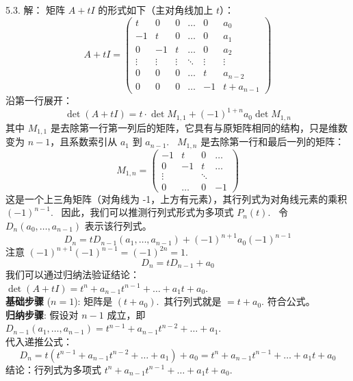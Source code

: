 \begin{exer}
5.3. 解：
矩阵 $A+tI$ 的形式如下（主对角线加上 $t$）：
$$ A+tI = \begin{pmatrix} t & 0 & 0 & \dots & 0 & a_0 \\ -1 & t & 0 & \dots & 0 & a_1 \\ 0 & -1 & t & \dots & 0 & a_2 \\ \vdots & \vdots & \vdots & \ddots & \vdots & \vdots \\ 0 & 0 & 0 & \dots & t & a_{n-2} \\ 0 & 0 & 0 & \dots & -1 & t+a_{n-1} \end{pmatrix} $$
沿第一行展开：
$$ \det(A+tI) = t \cdot \det M_{1,1} + (-1)^{1+n} a_0 \det M_{1,n} $$
其中 $M_{1,1}$ 是去除第一行第一列后的矩阵，它具有与原矩阵相同的结构，只是维数变为 $n-1$，且系数索引从 $a_1$ 到 $a_{n-1}$.~
$M_{1,n}$ 是去除第一行和最后一列的矩阵：
$$ M_{1,n} = \begin{pmatrix} -1 & t & 0 & \dots \\ 0 & -1 & t & \dots \\ \vdots & & \ddots & \\ 0 & \dots & 0 & -1 \end{pmatrix} $$
这是一个上三角矩阵（对角线为 -1，上方有元素），其行列式为对角线元素的乘积 $(-1)^{n-1}$.~
因此，我们可以推测行列式形式为多项式 $P_n(t)$.~
令 $D_n(a_0, \dots, a_{n-1})$ 表示该行列式。
$$ D_n = t D_{n-1}(a_1, \dots, a_{n-1}) + (-1)^{n+1} a_0 (-1)^{n-1} $$
注意 $(-1)^{n+1}(-1)^{n-1} = (-1)^{2n} = 1$.~
$$ D_n = t D_{n-1} + a_0 $$
我们可以通过归纳法验证结论：\\$\det(A+tI) = t^n + a_{n-1}t^{n-1} + \dots + a_1 t + a_0$.~\\
\textbf{基础步骤} ($n=1$): 矩阵是 $(t+a_0)$.~其行列式就是 $= t+a_0$. 符合公式。\\
\textbf{归纳步骤}: 假设对 $n-1$ 成立，即 $D_{n-1}(a_1, \dots, a_{n-1}) = t^{n-1} + a_{n-1}t^{n-2} + \dots + a_1$.~\\
代入递推公式：
$$ D_n = t (t^{n-1} + a_{n-1}t^{n-2} + \dots + a_1) + a_0 = t^n + a_{n-1}t^{n-1} + \dots + a_1 t + a_0 $$
结论：行列式为多项式 $t^n + a_{n-1}t^{n-1} + \dots + a_1 t + a_0$.~


\end{exer}
